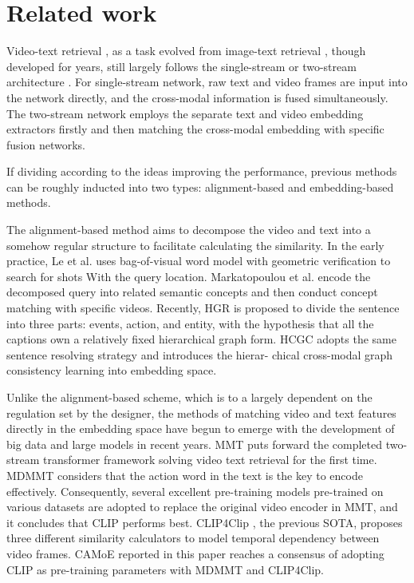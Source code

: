 \documentclass[letterpaper]{article} \usepackage{aaai22}  \usepackage{times}  \usepackage{helvet}  \usepackage{courier}  \usepackage[hyphens]{url}  \usepackage{graphicx} \urlstyle{rm} \def\UrlFont{\rm}  \usepackage{natbib}  \usepackage{caption}
\begin{document}
\section{Related work}



Video-text retrieval \cite{sivic2003video,yu2018joint,zhu2020actBert,lei2021less,gabeur2020multi,dzabraev2021mdmmt,mithun2018learning,arnab2021vivit}, as a task evolved from image-text retrieval \cite{faghri2017improving,frome2013devise,gong2014multi,gu2018look}, though developed for years, still largely follows the single-stream or two-stream architecture \cite{dzabraev2021mdmmt,zhu2020actBert,lei2021less,gabeur2020multi,fang2021clip2video,luo2021clip4clip}. For single-stream network, raw text and video frames are input into the network directly, and the cross-modal information is fused simultaneously. The two-stream network employs the separate text and video embedding extractors firstly and then matching the cross-modal embedding with specific fusion networks.


If dividing according to the ideas improving the performance, previous methods can be roughly inducted into two types: alignment-based and embedding-based methods. 


The alignment-based method aims to decompose the video and text into a somehow regular structure to facilitate calculating the similarity. In the early practice, Le et al. \cite{le2016nii} uses bag-of-visual word model with geometric verification to search for shots With the query location. Markatopoulou et al. \cite{markatopoulou2017query} encode the decomposed query into related semantic concepts and then conduct concept matching with specific videos. Recently, HGR \cite{chen2020fine} is proposed to divide the sentence into three parts: events, action, and entity, with the hypothesis that all the captions own a relatively fixed hierarchical graph form. HCGC \cite{jin2021hierarchical} adopts the same sentence resolving strategy and introduces the hierar- chical cross-modal graph consistency learning into embedding space.

Unlike the alignment-based scheme, which is to a largely dependent on the regulation set by the designer, the methods of matching video and text features directly in the embedding space have begun to emerge with the development of big data and large models in recent years. MMT \cite{gabeur2020multi} puts forward the completed two-stream transformer framework solving video text retrieval for the first time. MDMMT \cite{dzabraev2021mdmmt} considers that the action word in the text is the key to encode effectively. Consequently, several excellent pre-training models pre-trained on various datasets are adopted to replace the original video encoder in MMT, and it concludes that CLIP performs best. CLIP4Clip \cite{luo2021clip4clip}, the previous SOTA, proposes three different similarity calculators to model temporal dependency between video frames. CAMoE reported in this paper reaches a consensus of adopting CLIP as pre-training parameters with MDMMT and CLIP4Clip.
\end{document}
